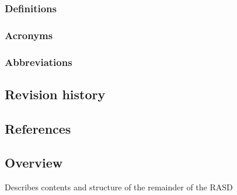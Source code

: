 \subsubsection{Definitions}
\label{subsect:definitions}

\subsubsection{Acronyms}
\label{subsect:acronyms}

\subsubsection{Abbreviations}
\label{subsect:abbreviations}

\subsection{Revision history}
\label{subsect:revisionhistory}

\subsection{References}
\label{subsect:references}

\subsection{Overview}
\label{subsect:overview}

Describes contents and structure of the remainder of the RASD